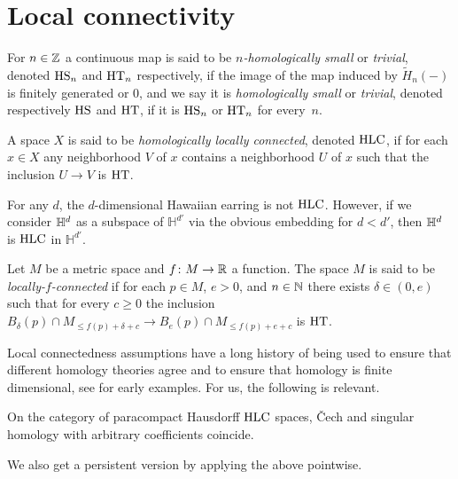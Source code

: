 
\section{Local connectivity}

\begin{defi} \label{defi:local_connectedness}
	For $n \in \mathbb{Z}$ a continuous map is said to be \textit{$n$-homologically small} or \textit{trivial}, denoted $\mathrm{HS}_n$ and $\mathrm{HT}_n$ respectively, if the image of the map induced by $\tilde H_n(-)$ is finitely generated or 0, and we say it is \textit{homologically small} or \textit{trivial}, denoted respectively $\mathrm{HS}$ and $\mathrm{HT}$, if it is $\mathrm{HS}_n$ or $\mathrm{HT}_n$ for every~$n$.
	
	A space $X$ is said to be \emph{homologically locally connected}, denoted $\mathrm{HLC}$, if for each $x \in X$ any neighborhood $V$ of $x$ contains a neighborhood $U$ of $x$ such that the inclusion $U \to V$ is $\mathrm{HT}$.
\end{defi}

\begin{ex}
	For any $d$, the $d$-dimensional Hawaiian earring is not $\mathrm{HLC}$. However, if we consider $\mathbb{H}^d$ as a subspace of $\mathbb{H}^{d'}$ via the obvious embedding for $d < d'$, then $\mathbb{H}^d$ is $\mathrm{HLC}$ in $\mathbb{H}^{d'}$.
\end{ex}

\begin{defi}
	Let $M$ be a metric space and $f \colon M \to \mathbb{R}$ a function.
	The space $M$ is said to be \textit{locally-$f$-connected} if for each $p \in M$, $e > 0$, and $n \in \mathbb{N}$ there exists $\delta \in (0, e)$ such that for every $c \geq 0$ the inclusion $B_\delta(p) \cap M_{\leq f(p)+\delta+c} \to B_e(p) \cap M_{\leq f(p)+e+c}$ is $\mathrm{HT}$.
\end{defi}

Local connectedness assumptions have a long history of being used to ensure that different homology theories agree and to ensure that homology is finite dimensional, see \cite{MR0007094} for early examples. For us, the following is relevant.

\begin{prop}[{\cite{MR105677, MR1481706}}]\label{prop:cech_sing_hom_hlc}
	On the category of paracompact Hausdorff $\mathrm{HLC}$ spaces, \v{C}ech and singular homology with arbitrary coefficients coincide.
\end{prop}

We also get a persistent version by applying the above pointwise.

